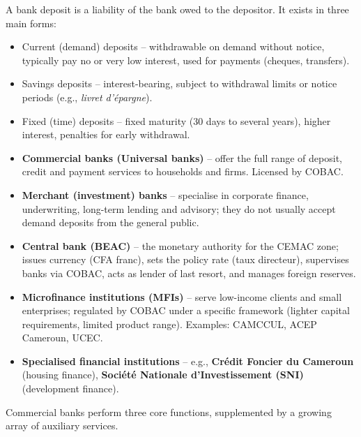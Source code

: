 \documentclass[11pt]{article}
\newcommand{\cle}[1]{{\popxbold\color{popdark}#1}}
\newcounter{popsec}
\newcounter{popsub}
\newcommand{\courssub}[1]{%
  \stepcounter{popsub}%
  \par\vspace{9pt}\noindent{\popxbold\fontsize{11.5}{13}\selectfont\color{popink}{\color{poporange}\thepopsec.\thepopsub}\hspace{6pt}#1}\par\nopagebreak\vspace{4pt}
}
\begin{document}
\begin{definition}
A \cle{bank deposit} is a liability of the bank owed to the depositor. It exists in three main forms:
\begin{itemize}
\item \cle{Current (demand) deposits} – withdrawable on demand without notice, typically pay no or very low interest, used for payments (cheques, transfers).
\item \cle{Savings deposits} – interest-bearing, subject to withdrawal limits or notice periods (e.g., \emph{livret d'épargne}).
\item \cle{Fixed (time) deposits} – fixed maturity (30 days to several years), higher interest, penalties for early withdrawal.
\end{itemize}
\end{definition}

\begin{aretenir}
\begin{itemize}
\item \textbf{Commercial banks (Universal banks)} – offer the full range of deposit, credit and payment services to households and firms. Licensed by COBAC.
\item \textbf{Merchant (investment) banks} – specialise in corporate finance, underwriting, long-term lending and advisory; they do not usually accept demand deposits from the general public.
\item \textbf{Central bank (BEAC)} – the monetary authority for the CEMAC zone; issues currency (CFA franc), sets the \cle{policy rate} (taux directeur), supervises banks via COBAC, acts as lender of last resort, and manages foreign reserves.
\item \textbf{Microfinance institutions (MFIs)} – serve low-income clients and small enterprises; regulated by COBAC under a specific framework (lighter capital requirements, limited product range). Examples: CAMCCUL, ACEP Cameroun, UCEC.
\item \textbf{Specialised financial institutions} – e.g., \textbf{Crédit Foncier du Cameroun} (housing finance), \textbf{Société Nationale d'Investissement (SNI)} (development finance).
\end{itemize}
\end{aretenir}

\courssub{Functions of Commercial Banks}

Commercial banks perform three core functions, supplemented by a growing array of auxiliary services.
\end{document}
